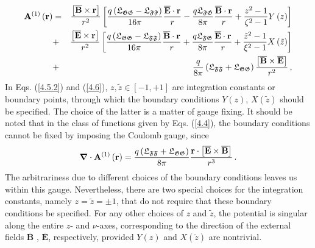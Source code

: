 \documentclass[12pt]{article}
\begin{document}
\begin{eqnarray}
\mathbf{A}^{\left( 1\right) }\left( \mathbf{r}\right)  &=&\frac{\left[ 
\overline{\mathbf{B}}\times \mathbf{r}\right] }{r^{2}}\left[ \frac{q\left( 
\mathfrak{L}_{\mathfrak{GG}}-\mathfrak{L}_{\mathfrak{FF}}\right) }{16\pi }%
\frac{\overline{\mathbf{E}}\cdot \mathbf{r}}{r}-\frac{q\mathfrak{L}_{%
\mathfrak{FG}}}{8\pi }\frac{\overline{\mathbf{B}}\cdot \mathbf{r}}{r}+\frac{%
z^{2}-1}{\zeta ^{2}-1}Y\left( z\right) \right]   \notag \\
&+&\frac{\left[ \overline{\mathbf{E}}\times \mathbf{r}\right] }{r^{2}}\left[ 
\frac{q\left( \mathfrak{L}_{\mathfrak{GG}}-\mathfrak{L}_{\mathfrak{FF}%
}\right) }{16\pi }\frac{\overline{\mathbf{B}}\cdot \mathbf{r}}{r}+\frac{q%
\mathfrak{L}_{\mathfrak{FG}}}{8\pi }\frac{\overline{\mathbf{E}}\cdot \mathbf{%
r}}{r}+\frac{\tilde{z}^{2}-1}{\xi ^{2}-1}X\left( \tilde{z}\right) \right]  
\notag \\
&+&\frac{q}{8\pi }\left( \mathfrak{L}_{\mathfrak{FF}}+\mathfrak{L}_{%
\mathfrak{GG}}\right) \frac{\left[ \overline{\mathbf{B}}\times \overline{%
\mathbf{E}}\right] }{r^{2}}\,,  \label{4.6}
\end{eqnarray}%
In Eqs. (\ref{4.5.2}) and (\ref{4.6}), $z,\tilde{z}\in \left[ -1,+1\right] $
are integration constants or boundary points, through which the boundary
conditions $Y\left( z\right) $, $X\left( \tilde{z}\right) $ should be
specified. The choice of the latter is a matter of gauge fixing. It should
be noted that in the class of functions given by Eqs. (\ref{4.4}), the
boundary conditions cannot be fixed by imposing the Coulomb gauge, since%
\begin{equation}
\boldsymbol{\nabla }\cdot \mathbf{A}^{\left( 1\right) }\left( \mathbf{r}%
\right) =\frac{q\left( \mathfrak{L}_{\mathfrak{FF}}+\mathfrak{L}_{\mathfrak{%
GG}}\right) }{8\pi }\frac{\mathbf{r}\cdot \left[ \overline{\mathbf{E}}\times 
\overline{\mathbf{B}}\right] }{r^{3}}\,.  \label{gauge}
\end{equation}%
The arbitrariness due to different choices of the boundary conditions leaves
us within this gauge. Nevertheless, there are two special choices for the
integration constants, namely $z=\tilde{z}=\pm 1$, that do not require that
these boundary conditions be specified. For any other choices of $z$ and $%
\tilde{z}$, the potential is singular along the entire $z$- and $\nu $-axes,
corresponding to the direction of the external fields $\overline{\mathbf{B}}$%
, $\overline{\mathbf{E}}$, respectively, provided $Y\left( z\right) $ and $%
X\left( \tilde{z}\right) $ are nontrivial.
\end{document}
